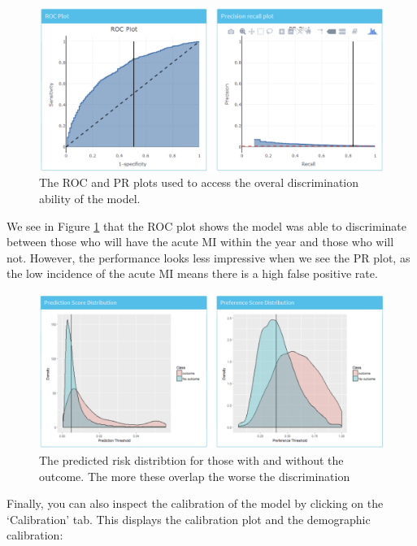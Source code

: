 \documentclass[11pt]{book}
\theoremstyle{definition}
\theoremstyle{definition}
\theoremstyle{definition}
\theoremstyle{remark}
\begin{document}
\begin{figure}

{\centering \includegraphics[width=0.8\linewidth]{images/PatientLevelPrediction/shiny/shinyPerformanceDisc} 

}

\caption{The ROC and PR plots used to access the overal discrimination ability of the model.}\label{fig:shinyPerformanceDisc}
\end{figure}

We see in Figure \ref{fig:shinyPerformanceDisc} that the ROC plot shows the model was able to discriminate between those who will have the acute MI within the year and those who will not. However, the performance looks less impressive when we see the PR plot, as the low incidence of the acute MI means there is a high false positive rate.

\begin{figure}

{\centering \includegraphics[width=0.8\linewidth]{images/PatientLevelPrediction/shiny/shinyPerformanceDist} 

}

\caption{The predicted risk distribtion for those with and without the outcome.  The more these overlap the worse the discrimination}\label{fig:shinyPerformanceDist}
\end{figure}

Finally, you can also inspect the calibration of the model by clicking on the `Calibration' tab. This displays the calibration plot and the demographic calibration:
\end{document}
